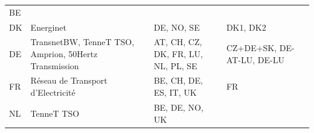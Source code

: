 \begin{longtable}[]{@{}llll@{}}
\begin{minipage}[t]{0.22\columnwidth}
BE\strut
\end{minipage}\tabularnewline
\begin{minipage}[t]{0.07\columnwidth}\raggedright
DK\strut
\end{minipage} & \begin{minipage}[t]{0.36\columnwidth}\raggedright
Energinet\strut
\end{minipage} & \begin{minipage}[t]{0.22\columnwidth}\raggedright
DE, NO, SE\strut
\end{minipage} & \begin{minipage}[t]{0.22\columnwidth}\raggedright
DK1, DK2\strut
\end{minipage}\tabularnewline
\begin{minipage}[t]{0.07\columnwidth}\raggedright
DE\strut
\end{minipage} & \begin{minipage}[t]{0.36\columnwidth}\raggedright
TransnetBW, TenneT TSO, Amprion, 50Hertz Transmission\strut
\end{minipage} & \begin{minipage}[t]{0.22\columnwidth}\raggedright
AT, CH, CZ, DK, FR, LU, NL, PL, SE\strut
\end{minipage} & \begin{minipage}[t]{0.22\columnwidth}\raggedright
CZ+DE+SK, DE-AT-LU, DE-LU\strut
\end{minipage}\tabularnewline
\begin{minipage}[t]{0.07\columnwidth}\raggedright
FR\strut
\end{minipage} & \begin{minipage}[t]{0.36\columnwidth}\raggedright
Réseau de Transport d'Electricité\strut
\end{minipage} & \begin{minipage}[t]{0.22\columnwidth}\raggedright
BE, CH, DE, ES, IT, UK\strut
\end{minipage} & \begin{minipage}[t]{0.22\columnwidth}\raggedright
FR\strut
\end{minipage}\tabularnewline
\begin{minipage}[t]{0.07\columnwidth}\raggedright
NL\strut
\end{minipage} & \begin{minipage}[t]{0.36\columnwidth}\raggedright
TenneT TSO\strut
\end{minipage} & \begin{minipage}[t]{0.22\columnwidth}\raggedright
BE, DE, NO, UK\strut
\end{minipage} & \begin{minipage}[t]{0.22\columnwidth}\raggedright

\end{minipage}
\end{longtable}
